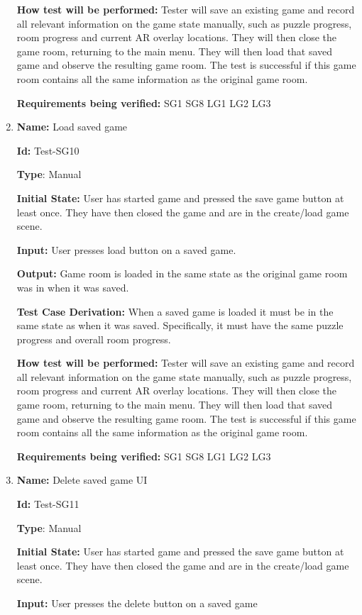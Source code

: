 \documentclass[12pt, titlepage]{article}
\begin{document}
\begin{enumerate}
\textbf{How test will be performed:}
Tester will save an existing game and record all relevant information on the game state manually, such as puzzle progress, room progress and current AR overlay locations. They will then close the game room, returning to the main menu. They will then load that saved game and observe the resulting game room. The test is successful if this game room contains all the same information as the original game room.

\textbf{Requirements being verified: } SG1 SG8 LG1 LG2 LG3

\item{\textbf{Name:} Load saved game}

\textbf{Id:} Test-SG10

\textbf{Type}: Manual

\textbf{Initial State:} User has started game and pressed the save game button at least once. They have then closed the game and are in the create/load game scene. 

\textbf{Input:} User presses load button on a saved game.

\textbf{Output:} Game room is loaded in the same state as the original game room was in when it was saved.

\textbf{Test Case Derivation:}
When a saved game is loaded it must be in the same state as when it was saved. Specifically, it must have the same puzzle progress and overall room progress.

\textbf{How test will be performed:}
Tester will save an existing game and record all relevant information on the game state manually, such as puzzle progress, room progress and current AR overlay locations. They will then close the game room, returning to the main menu. They will then load that saved game and observe the resulting game room. The test is successful if this game room contains all the same information as the original game room.

\textbf{Requirements being verified: } SG1 SG8 LG1 LG2 LG3

\item{\textbf{Name:} Delete saved game UI}

\textbf{Id:} Test-SG11

\textbf{Type}: Manual

\textbf{Initial State:} User has started game and pressed the save game button at least once. They have then closed the game and are in the create/load game scene. 

\textbf{Input:} User presses the delete button on a saved game


\end{enumerate}
\end{document}
